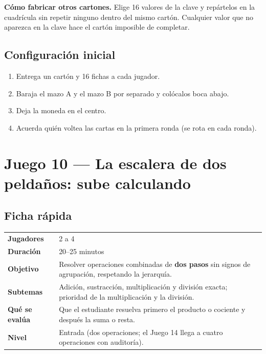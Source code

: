 \documentclass[12pt, letterpaper]{article}
\begin{document}
\begin{cuadroadvertencia}
\textbf{Cómo fabricar otros cartones.} Elige 16 valores de la clave y repártelos en la cuadrícula sin repetir ninguno dentro del mismo cartón. Cualquier valor que no aparezca en la clave hace el cartón imposible de completar.
\end{cuadroadvertencia}

\subsection{Configuración inicial}

\begin{enumerate}[leftmargin=*]
  \item Entrega un cartón y 16 fichas a cada jugador.
  \item Baraja el mazo A y el mazo B por separado y colócalos boca abajo.
  \item Deja la moneda en el centro.
  \item Acuerda quién voltea las cartas en la primera ronda (se rota en cada ronda).
\end{enumerate}

\clearpage
\section{Juego 10 — La escalera de dos peldaños: sube calculando}

\subsection{Ficha rápida}

\begin{center}
\small
\begin{tabular}{@{}p{3cm} p{12.2cm}@{}}
\toprule
\textbf{Jugadores} & 2 a 4\\
\textbf{Duración} & 20--25 minutos\\
\textbf{Objetivo} & Resolver operaciones combinadas de \textbf{dos pasos} sin signos de agrupación, respetando la jerarquía.\\
\textbf{Subtemas} & Adición, sustracción, multiplicación y división exacta; prioridad de la multiplicación y la división.\\
\textbf{Qué se evalúa} & Que el estudiante resuelva primero el producto o cociente y después la suma o resta.\\
\textbf{Nivel} & Entrada (dos operaciones; el Juego 14 llega a cuatro operaciones con auditoría).\\
\bottomrule
\end{tabular}
\end{center}
\end{document}
